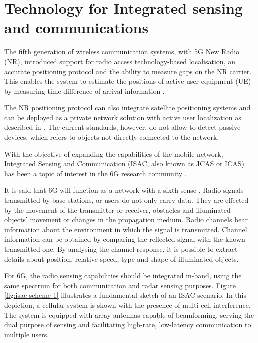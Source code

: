 \chapter{Technology for Integrated sensing and communications}

The fifth generation of wireless communication systems, with 5G New Radio (NR), introduced support for radio access technology-based localisation, an accurate positioning protocol and the ability to measure gaps on the NR carrier. 
This enables the system to estimate the positions of active user equipment (UE) by measuring time difference of arrival information \cite{Keating_Saily_Hulkkonen_Karjalainen_2019}.

The NR positioning protocol can also integrate satellite positioning systems and can be deployed as a private network solution with active user localization as described in  \cite{Henninger_Abrudan_Mandelli_Arnold_Saur_Kolmonen_Klein_Schlitter_Brink_2022}.
The current standards, however, do not allow to detect passive devices, which refers to objects not directly connected to the network.

With the objective of expanding the capabilities of the mobile network, Integrated Sensing and Communication (ISAC, also known as JCAS or ICAS) has been a topic of interest in the 6G research community \cite{Mandelli_Henninger_Bauhofer_Wild_2023}.

It is said that 6G will function as a network with a sixth sense \cite{Viswanathan_Wild_2021}. Radio signals transmitted by base stations, or users do not only carry data. They are effected by the movement of the transmitter or receiver, obstacles and illuminated objects' movement or changes in the propagation medium. Radio channels bear information about the environment in which the signal is transmitted. 
Channel information can be obtained by comparing the reflected signal with the known transmitted one. By analysing the channel response, it is possible to extract details about position, relative speed, type and shape of illuminated objects.

For 6G, the radio sensing capabilities should be integrated in-band, using the same spectrum for both communication and radar sensing purposes. Figure \ref{fig:isac-scheme-1} illustrates a fundamental sketch of an ISAC scenario. In this depiction, a cellular system is shown with the presence of multi-cell interference. The system is equipped with array antennas capable of beamforming, serving the dual purpose of sensing and facilitating high-rate, low-latency communication to multiple users.

